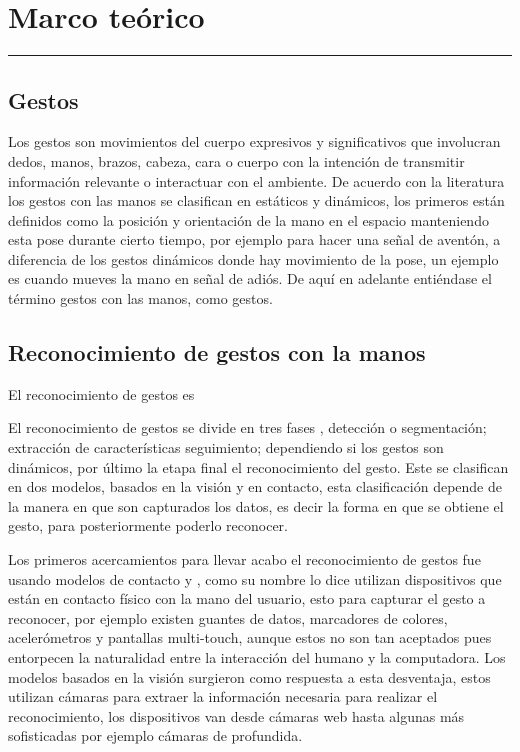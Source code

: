 \chapter{Marco te\'orico}\label{capit:cap2}
\vspace{-2.0325ex}%
\noindent
\rule{\textwidth}{0.5pt}
\vspace{-5.5ex}%
\newcommand{\pushline}{\Indp}%

\section{Gestos}\label{sec:2Gestos}
Los gestos \citep{Mitra2007} son movimientos del cuerpo expresivos y significativos que involucran dedos, manos, brazos, cabeza, cara o cuerpo con la intención de transmitir información relevante o interactuar con el ambiente. De acuerdo con la literatura \citep{Mitra2007} los gestos con las manos se clasifican en estáticos y dinámicos, los primeros están definidos como la posición y orientación de la mano en el espacio manteniendo esta pose durante cierto tiempo, por ejemplo para hacer una se\~nal de aventón, a diferencia de los gestos dinámicos donde hay movimiento de la pose, un ejemplo  es cuando mueves la mano en se\~nal de adiós. De aquí en adelante entiéndase el término gestos con las manos, como gestos.  

\section{Reconocimiento de gestos con la manos}\label{sec:2ReconocimientoGestos}  

El reconocimiento de gestos es 

El reconocimiento de gestos se divide en tres fases \citep{Rautaray2012}, detección o segmentación; extracci\'on de caracter\'isticas seguimiento; dependiendo si los gestos son dinámicos, por último la etapa final el reconocimiento del gesto.  
Este se clasifican en dos modelos, basados en la visi\'on y en contacto, esta clasificaci\'on depende de la manera en que son capturados los datos, es decir la forma en que se obtiene el gesto, para posteriormente poderlo reconocer. 

Los primeros acercamientos para llevar acabo el reconocimiento de gestos fue usando modelos de contacto \citep{Rautaray2012} y \citep{Nayakwadi2014}, como su nombre lo dice utilizan dispositivos que est\'an en contacto f\'isico con la mano del usuario, esto para capturar el gesto a reconocer, por ejemplo existen guantes de datos, marcadores de colores, acelerómetros y pantallas multi-touch, aunque estos no son tan aceptados pues entorpecen la naturalidad entre la interacción del humano y la computadora. Los modelos basados en la visi\'on surgieron como respuesta a esta desventaja, estos utilizan cámaras para extraer la información necesaria para realizar el reconocimiento, los dispositivos van desde c\'amaras web hasta algunas más sofisticadas por ejemplo c\'amaras de profundida.  

